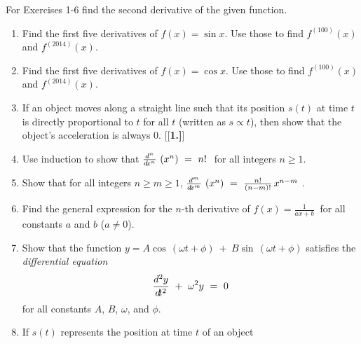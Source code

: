 \divider
\vspace{3mm}
\startexercises\label{sec1dot6}
{\small
{}
\par\noindent For Exercises 1-6 find the second derivative of the given function.
\begin{enumerate}[\bfseries 1.]
 \item Find the first five derivatives of $f(x) = \sin x$. Use those to find $f^{(100)}(x)$ and $f^{(2014)}(x)$.
 \item Find the first five derivatives of $f(x) = \cos x$. Use those to find $f^{(100)}(x)$ and $f^{(2014)}(x)$.
 \item If an object moves along a straight line such that its position
  $s(t)$ at time $t$ is directly proportional to $t$ for all $t$ (written as
  $s \propto t$), then show that the object's acceleration is always 0.
[{[\bfseries 1.]}]
 \item\label{exer:dnxn} Use induction to show that
  $\frac{d^n}{d\!x^n}\,\left(x^n\right) ~=~ n!~$ for all integers $n \ge 1$.
 \item Show that for all integers $n \ge m \ge 1$,
  $\frac{d^{m}}{d\!x^{m}}\,\left(x^n\right) ~=~ \frac{n!}{(n - m)!}\,x^{n - m} ~$.
 \item Find the general expression for the $n$-th derivative of
  $f(x) = \frac{1}{ax + b} ~$ for all constants $a$ and $b$ ($a \ne 0$).
 \item Show that the function $y = A \cos\,(\omega t + \phi) ~+~  B \sin\,(\omega t + \phi)$
  satisfies the \emph{differential equation}
  \[
   \frac{d^2y}{d\!t^2} ~+~ \omega^2 y ~=~ 0
  \]
  for all constants $A$, $B$, $\omega$, and $\phi$.
 \item If $s(t)$ represents the position at time $t$ of an object

\end{enumerate}}
